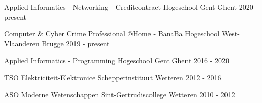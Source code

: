 

\begin{cventries}
	
\cventry
{Applied Informatics - Networking - Creditcontract} %
{Hogeschool Gent} %
{Ghent} %
{2020 - present} %
{
}

\cventry
{Computer \& Cyber Crime Professional @Home - BanaBa} %
{Hogeschool West-Vlaanderen} %
{Brugge} %
{2019 - present} %
{
}

\cventry
{Applied Informatics - Programming} %
{Hogeschool Gent} %
{Ghent} %
{2016 - 2020} %
{
}

\cventry
{TSO Elektriciteit-Elektronice} %
{Schepperinstituut} %
{Wetteren} %
{2012 - 2016} %
{
}

  \cventry
    {ASO Moderne Wetenschappen} %
    {Sint-Gertrudiscollege} %
    {Wetteren} %
    {2010 - 2012} %
    {
    }

\end{cventries}
